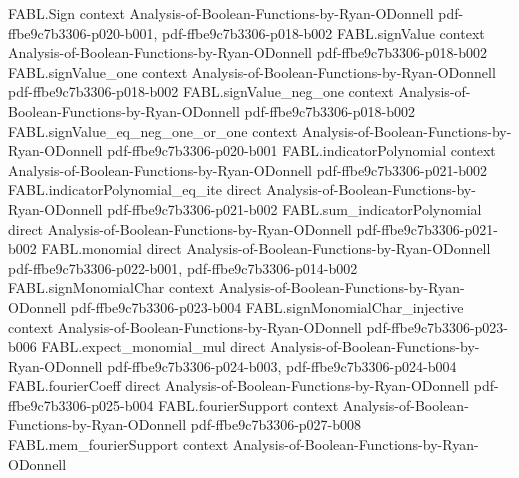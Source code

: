 \begin{theorem}
\label{FABL.condorcetWinnerProbability_eventually_le_seven_ninths_add_four_div_nine_pi_add}
\leanok
{}
\proofstep
  {FABL.Sign}
  {context}
  {Analysis-of-Boolean-Functions-by-Ryan-ODonnell}
  {pdf-ffbe9c7b3306-p020-b001,
    pdf-ffbe9c7b3306-p018-b002}
\proofstep
  {FABL.signValue}
  {context}
  {Analysis-of-Boolean-Functions-by-Ryan-ODonnell}
  {pdf-ffbe9c7b3306-p018-b002}
\proofstep
  {FABL.signValue_one}
  {context}
  {Analysis-of-Boolean-Functions-by-Ryan-ODonnell}
  {pdf-ffbe9c7b3306-p018-b002}
\proofstep
  {FABL.signValue_neg_one}
  {context}
  {Analysis-of-Boolean-Functions-by-Ryan-ODonnell}
  {pdf-ffbe9c7b3306-p018-b002}
\proofstep
  {FABL.signValue_eq_neg_one_or_one}
  {context}
  {Analysis-of-Boolean-Functions-by-Ryan-ODonnell}
  {pdf-ffbe9c7b3306-p020-b001}
\proofstep
  {FABL.indicatorPolynomial}
  {context}
  {Analysis-of-Boolean-Functions-by-Ryan-ODonnell}
  {pdf-ffbe9c7b3306-p021-b002}
\proofstep
  {FABL.indicatorPolynomial_eq_ite}
  {direct}
  {Analysis-of-Boolean-Functions-by-Ryan-ODonnell}
  {pdf-ffbe9c7b3306-p021-b002}
\proofstep
  {FABL.sum_indicatorPolynomial}
  {direct}
  {Analysis-of-Boolean-Functions-by-Ryan-ODonnell}
  {pdf-ffbe9c7b3306-p021-b002}
\proofstep
  {FABL.monomial}
  {direct}
  {Analysis-of-Boolean-Functions-by-Ryan-ODonnell}
  {pdf-ffbe9c7b3306-p022-b001,
    pdf-ffbe9c7b3306-p014-b002}
\proofstep
  {FABL.signMonomialChar}
  {context}
  {Analysis-of-Boolean-Functions-by-Ryan-ODonnell}
  {pdf-ffbe9c7b3306-p023-b004}
\proofstep
  {FABL.signMonomialChar_injective}
  {context}
  {Analysis-of-Boolean-Functions-by-Ryan-ODonnell}
  {pdf-ffbe9c7b3306-p023-b006}
\proofstep
  {FABL.expect_monomial_mul}
  {direct}
  {Analysis-of-Boolean-Functions-by-Ryan-ODonnell}
  {pdf-ffbe9c7b3306-p024-b003,
    pdf-ffbe9c7b3306-p024-b004}
\proofstep
  {FABL.fourierCoeff}
  {direct}
  {Analysis-of-Boolean-Functions-by-Ryan-ODonnell}
  {pdf-ffbe9c7b3306-p025-b004}
\proofstep
  {FABL.fourierSupport}
  {context}
  {Analysis-of-Boolean-Functions-by-Ryan-ODonnell}
  {pdf-ffbe9c7b3306-p027-b008}
\proofstep
  {FABL.mem_fourierSupport}
  {context}
  {Analysis-of-Boolean-Functions-by-Ryan-ODonnell}

\end{theorem}

